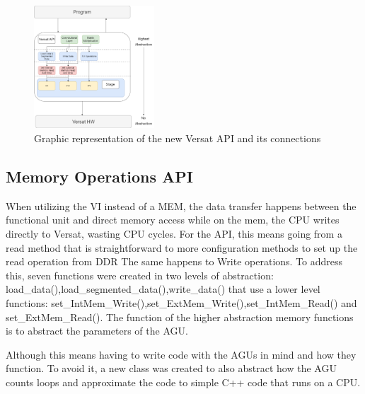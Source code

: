 \documentclass[conference]{IEEEtran}
\begin{document}
\begin{figure}[!htbp]
    \centering
    \includegraphics[width=0.4\textwidth]{Figures/VersatMemory.drawio.png}
    \caption{Graphic representation of the new Versat API and its connections}
    \label{newAPI}
\end{figure} 


\subsection{Memory Operations API}

When utilizing the VI instead of a MEM, the data transfer happens between the functional unit and direct memory access while
on the mem, the CPU writes directly to Versat, wasting CPU cycles. For the API, this means going from a read method that is straightforward
to more configuration methods to set up the read operation from DDR The same happens to Write operations. To address this, seven functions were created in two levels of abstraction:
load\_data(),load\_segmented\_data(),write\_data() that use a lower level functions: set\_IntMem\_Write(),set\_ExtMem\_Write(),set\_IntMem\_Read() and set\_ExtMem\_Read().
The function of the higher abstraction memory functions is to abstract the parameters of the AGU. 

% 


Although this means having to write code with the AGUs in mind
and how they function. To avoid it, a new class was created to also abstract how the AGU counts loops and approximate 
the code to simple C++ code that runs on a CPU.

% 
\end{document}
